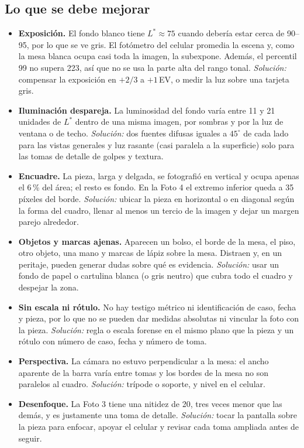 \documentclass[runningheads]{llncs}
\begin{document}
\subsection{Lo que se debe mejorar}

\begin{itemize}
\item \textbf{Exposición.} El fondo blanco tiene $L^*\approx75$ cuando debería estar cerca de 90--95, por lo que se ve gris. El fotómetro del celular promedia la escena y, como la mesa blanca ocupa casi toda la imagen, la subexpone. Además, el percentil 99 no supera 223, así que no se usa la parte alta del rango tonal. \emph{Solución:} compensar la exposición en $+2/3$ a $+1$\,EV, o medir la luz sobre una tarjeta gris.
\item \textbf{Iluminación despareja.} La luminosidad del fondo varía entre 11 y 21 unidades de $L^*$ dentro de una misma imagen, por sombras y por la luz de ventana o de techo. \emph{Solución:} dos fuentes difusas iguales a $45^\circ$ de cada lado para las vistas generales y luz rasante (casi paralela a la superficie) solo para las tomas de detalle de golpes y textura.
\item \textbf{Encuadre.} La pieza, larga y delgada, se fotografió en vertical y ocupa apenas el 6\,\% del área; el resto es fondo. En la Foto 4 el extremo inferior queda a 35 píxeles del borde. \emph{Solución:} ubicar la pieza en horizontal o en diagonal según la forma del cuadro, llenar al menos un tercio de la imagen y dejar un margen parejo alrededor.
\item \textbf{Objetos y marcas ajenas.} Aparecen un bolso, el borde de la mesa, el piso, otro objeto, una mano y marcas de lápiz sobre la mesa. Distraen y, en un peritaje, pueden generar dudas sobre qué es evidencia. \emph{Solución:} usar un fondo de papel o cartulina blanca (o gris neutro) que cubra todo el cuadro y despejar la zona.
\item \textbf{Sin escala ni rótulo.} No hay testigo métrico ni identificación de caso, fecha y pieza, por lo que no se pueden dar medidas absolutas ni vincular la foto con la pieza. \emph{Solución:} regla o escala forense en el mismo plano que la pieza y un rótulo con número de caso, fecha y número de toma.
\item \textbf{Perspectiva.} La cámara no estuvo perpendicular a la mesa: el ancho aparente de la barra varía entre tomas y los bordes de la mesa no son paralelos al cuadro. \emph{Solución:} trípode o soporte, y nivel en el celular.
\item \textbf{Desenfoque.} La Foto 3 tiene una nitidez de 20, tres veces menor que las demás, y es justamente una toma de detalle. \emph{Solución:} tocar la pantalla sobre la pieza para enfocar, apoyar el celular y revisar cada toma ampliada antes de seguir.

\end{itemize}
\end{document}
